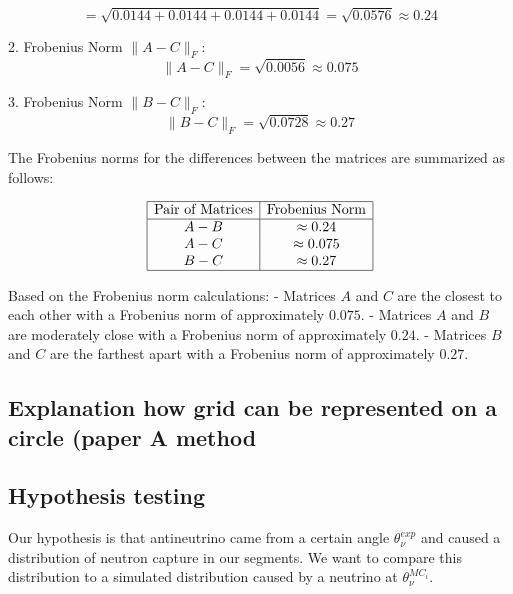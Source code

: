 \[
= \sqrt{0.0144 + 0.0144 + 0.0144 + 0.0144} = \sqrt{0.0576} \approx 0.24
\]

2. Frobenius Norm \( \| A - C \|_F \):
\[
\| A - C \|_F =  \sqrt{0.0056} \approx 0.075
\]

3. Frobenius Norm \( \| B - C \|_F \):
\[
\| B - C \|_F = \sqrt{0.0728} \approx 0.27
\]

The Frobenius norms for the differences between the matrices are summarized as follows:

\[
\begin{array}{|c|c|}
\hline
\text{Pair of Matrices} & \text{Frobenius Norm} \\
\hline
A - B & \approx 0.24 \\
A - C & \approx 0.075 \\
B - C & \approx 0.27 \\
\hline
\end{array}
\]


Based on the Frobenius norm calculations:
- Matrices \( A \) and \( C \) are the closest to each other with a Frobenius norm of approximately \( 0.075 \).
- Matrices \( A \) and \( B \) are moderately close with a Frobenius norm of approximately \( 0.24 \).
- Matrices \( B \) and \( C \) are the farthest apart with a Frobenius norm of approximately \( 0.27 \).

\subsection{Explanation how grid can be represented on a circle (paper A method}

\subsection{Hypothesis testing}
Our hypothesis is that antineutrino came from a certain angle $\theta_\nu^{exp}$ and caused a distribution of neutron capture in our segments. We want to compare this distribution to a simulated distribution caused by a neutrino at $\theta_\nu^{MC_i}$.


